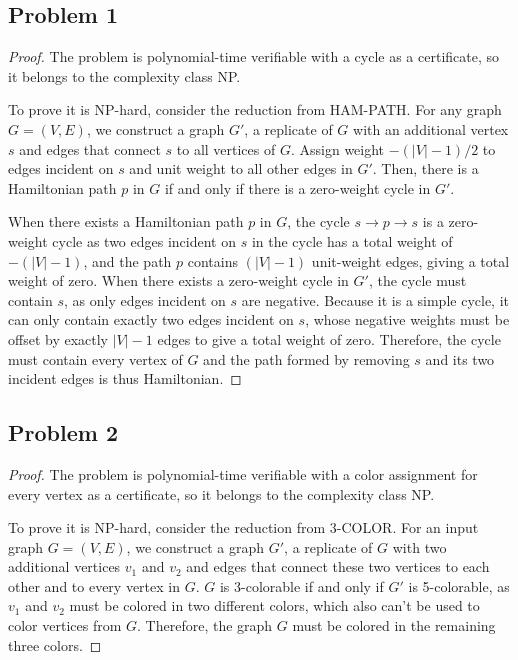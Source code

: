 \documentclass{article}
\begin{document}
\subsection*{Problem 1}

\begin{proof}
    The problem is polynomial-time verifiable with a cycle as a certificate, so it belongs to the complexity class NP.

    To prove it is NP-hard, consider the reduction from HAM-PATH. For any graph $G = (V, E)$, we construct a graph $G'$, a replicate of $G$ with an additional vertex $s$ and edges that connect $s$ to all vertices of $G$. Assign weight $-(|V| - 1)/2$ to edges incident on $s$ and unit weight to all other edges in $G'$. Then, there is a Hamiltonian path $p$ in $G$ if and only if there is a zero-weight cycle in $G'$.

    When there exists a Hamiltonian path $p$ in $G$, the cycle $s \to p \to s$ is a zero-weight cycle as two edges incident on $s$ in the cycle has a total weight of $-(|V| - 1)$, and the path $p$ contains $(|V| - 1)$ unit-weight edges, giving a total weight of zero. When there exists a zero-weight cycle in $G'$, the cycle must contain $s$, as only edges incident on $s$ are negative. Because it is a simple cycle, it can only contain exactly two edges incident on $s$, whose negative weights must be offset by exactly $|V| - 1$ edges to give a total weight of zero. Therefore, the cycle must contain every vertex of $G$ and the path formed by removing $s$ and its two incident edges is thus Hamiltonian.
\end{proof}

\subsection*{Problem 2}

\begin{proof}
    The problem is polynomial-time verifiable with a color assignment for every vertex as a certificate, so it belongs to the complexity class NP.

    To prove it is NP-hard, consider the reduction from 3-COLOR. For an input graph $G = (V, E)$, we construct a graph $G'$, a replicate of $G$ with two additional vertices $v_1$ and $v_2$ and edges that connect these two vertices to each other and to every vertex in $G$. $G$ is 3-colorable if and only if $G'$ is 5-colorable, as $v_1$ and $v_2$ must be colored in two different colors, which also can't be used to color vertices from $G$. Therefore, the graph $G$ must be colored in the remaining three colors.
\end{proof}
\end{document}
